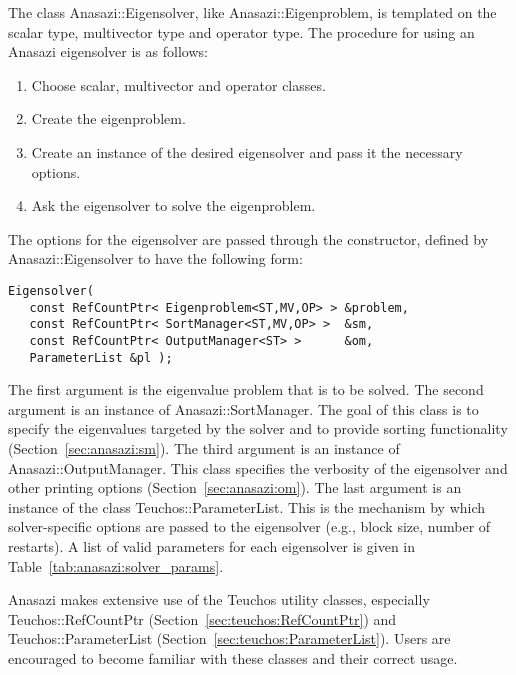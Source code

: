 The class Anasazi::Eigensolver, like Anasazi::Eigenproblem, is
templated on the scalar type, multivector type and operator
type. The procedure for using an Anasazi eigensolver is as follows:
\begin{enumerate}
\item Choose scalar, multivector and operator classes.
\item Create the eigenproblem.
\item Create an instance of the desired eigensolver and pass it the necessary
options.
\item Ask the eigensolver to solve the eigenproblem.
\end{enumerate}

The options for the eigensolver are passed through the constructor, defined by
Anasazi::Eigensolver to have the following form:
\begin{verbatim}
Eigensolver( 
   const RefCountPtr< Eigenproblem<ST,MV,OP> > &problem, 
   const RefCountPtr< SortManager<ST,MV,OP> >  &sm,
   const RefCountPtr< OutputManager<ST> >      &om,
   ParameterList &pl );
\end{verbatim}

\noindent The first argument is the eigenvalue problem that is to be solved.
The second argument is an instance of Anasazi::SortManager. The goal of this
class is to specify the eigenvalues targeted by the solver and to provide
sorting functionality (Section~\ref{sec:anasazi:sm}). The third argument is an
instance of Anasazi::OutputManager. This class specifies the verbosity of the
eigensolver and other printing options (Section~\ref{sec:anasazi:om}). The last
argument is an instance of the class Teuchos::ParameterList. This is the
mechanism by which solver-specific options are passed to the eigensolver (e.g.,
block size, number of restarts). A list of valid parameters for each
eigensolver is given in Table~\ref{tab:anasazi:solver_params}.

\begin{remark}
Anasazi makes extensive use of the Teuchos utility classes, especially
Teuchos::RefCountPtr (Section~\ref{sec:teuchos:RefCountPtr}) and
Teuchos::ParameterList (Section~\ref{sec:teuchos:ParameterList}). Users
are encouraged to become familiar with these classes and their correct
usage.
\end{remark}

